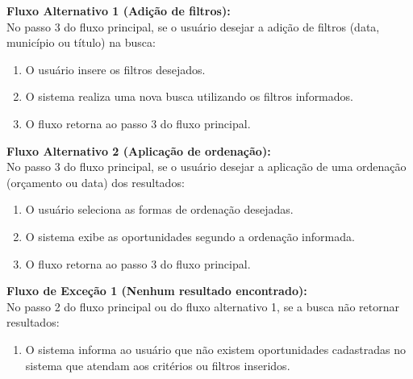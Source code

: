 \noindent\textbf{Fluxo Alternativo 1 (Adição de filtros):}\\
No passo 3 do fluxo principal, se o usuário desejar a adição de filtros (data, município ou título) na busca:
\begin{enumerate}[noitemsep, topsep=-5pt, parsep=0pt]
    \item O usuário insere os filtros desejados.
    \item O sistema realiza uma nova busca utilizando os filtros informados.
    \item O fluxo retorna ao passo 3 do fluxo principal.
\end{enumerate}

\noindent\textbf{Fluxo Alternativo 2 (Aplicação de ordenação):}\\
No passo 3 do fluxo principal, se o usuário desejar a aplicação de uma ordenação (orçamento ou data) dos resultados:
\begin{enumerate}[noitemsep, topsep=-5pt, parsep=0pt]
    \item O usuário seleciona as formas de ordenação desejadas.
    \item O sistema exibe as oportunidades segundo a ordenação informada.
    \item O fluxo retorna ao passo 3 do fluxo principal.
\end{enumerate}

\noindent\textbf{Fluxo de Exceção 1 (Nenhum resultado encontrado):}\\
No passo 2 do fluxo principal ou do fluxo alternativo 1, se a busca não retornar resultados:
\begin{enumerate}[noitemsep, topsep=-5pt, parsep=0pt]
    \item O sistema informa ao usuário que não existem oportunidades cadastradas no sistema que atendam aos critérios ou filtros inseridos.
\end{enumerate}


